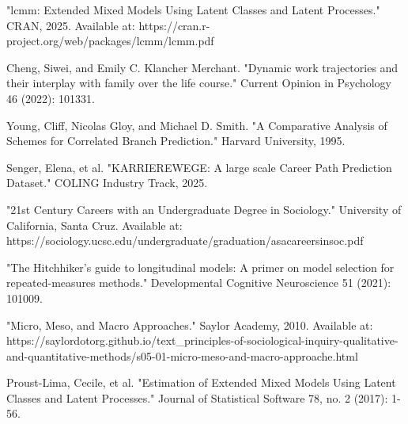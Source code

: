 \documentclass[main.tex]{subfiles}
\begin{document}
\begin{thebibliography}{20}
 "lcmm: Extended Mixed Models Using Latent Classes and Latent Processes." CRAN, 2025. Available at: https://cran.r-project.org/web/packages/lcmm/lcmm.pdf

 Cheng, Siwei, and Emily C. Klancher Merchant. "Dynamic work trajectories and their interplay with family over the life course." Current Opinion in Psychology 46 (2022): 101331.

 Young, Cliff, Nicolas Gloy, and Michael D. Smith. "A Comparative Analysis of Schemes for Correlated Branch Prediction." Harvard University, 1995.

 Senger, Elena, et al. "KARRIEREWEGE: A large scale Career Path Prediction Dataset." COLING Industry Track, 2025.

 "21st Century Careers with an Undergraduate Degree in Sociology." University of California, Santa Cruz. Available at: https://sociology.ucsc.edu/undergraduate/graduation/asacareersinsoc.pdf

 "The Hitchhiker's guide to longitudinal models: A primer on model selection for repeated-measures methods." Developmental Cognitive Neuroscience 51 (2021): 101009.

 "Micro, Meso, and Macro Approaches." Saylor Academy, 2010. Available at: https://saylordotorg.github.io/text\_principles-of-sociological-inquiry-qualitative-and-quantitative-methods/s05-01-micro-meso-and-macro-approache.html

 Proust-Lima, Cecile, et al. "Estimation of Extended Mixed Models Using Latent Classes and Latent Processes." Journal of Statistical Software 78, no. 2 (2017): 1-56.

\end{thebibliography}
\end{document}
